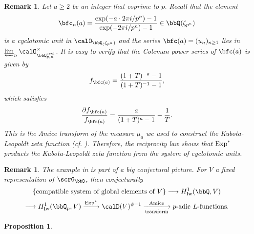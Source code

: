 \documentclass[a4paper,oneside]{amsart}
\newtheorem{remark}[theorem]{Remark}
\newtheorem{proposition}[theorem]{Proposition}
\numberwithin{equation}{section}
\numberwithin{figure}{section}
\begin{document}
\begin{remark}\label{rmk:23241}
    Let $a\geq 2$ be an integer that coprime to $p$. Recall that the element
    $$\bfc_n(a)=\frac{\exp(-a\cdot2\pi i/p^n)-1}{\exp(-2\pi i/p^n)-1}\in\bbQ(\zeta_{p^n})$$
    is a cyclotomic unit in $\calO_{\bbQ_(\zeta_{p^n})}$ and the series $\bfc(a)=(u_n)_{n\geq 1}$ lies in $\varprojlim_n \calO_{\bbQ_{p,n}^{\opn{cycl}}}^\times$. It is easy to verify that the Coleman power series of $\bfc(a)$ is given by
    $$f_{\bfc(a)}=\frac{(1+T)^{-a}-1}{(1+T)^{-1}-1},$$
    which satisfies
    $$\frac{\partial f_{\bfc(a)}}{f_{\bfc(a)}}=\frac{a}{(1+T)^a-1}-\frac{1}{T}.$$
    This is the Amice transform of the measure $\mu_a$ we used to construct the Kubota-Leopoldt zeta function (cf. \cite[Proposition 1.6]{colmez_fonction_nodate}). Therefore, the reciprocity law shows that $\operatorname{Exp}^*$ products the Kubota-Leopoldt zeta function from the system of cyclotomic units.
\end{remark}
\begin{remark}
    The example in  is part of a big conjectural picture. For $V$ a fixed representation of $\scrG_\bbQ$, then conjecturally
    $$\{\text{compatible system of global elements of $V$}\}\lto H_{\opn{Iw}}^1(\bbQ,V)$$
    $$\lto H_{\opn{Iw}}^1(\bbQ_p,V)\xlto{\opn{Exp}^*}\calD(V)^{\psi=1}\xlto[\text{transform}]{\text{Amice}} p\text{-adic $L$-functions}.$$
\end{remark}

\begin{proposition}

\end{proposition}
\end{document}
